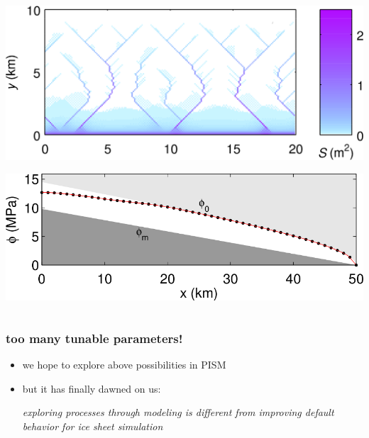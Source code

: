\documentclass[hide notes,intlimits]{beamer}
\begin{document}
\begin{frame}
\begin{columns}
\begin{column}{0.4\textwidth}
\begin{center}
\vspace{4mm}

\includegraphics[width=1.0\textwidth]{schoof-channels}

\vspace{5mm}

\includegraphics[width=1.0\textwidth]{schoof-overburden}
\end{center}
\end{column}
\end{columns}

\end{frame}


\begin{frame}
  \frametitle{too many tunable parameters!}

  \begin{itemize}
  \item we hope to explore above possibilities in PISM
  \item but it has finally dawned on us:
  
  \begin{center}
  \emph{exploring processes through modeling is different from improving default behavior for ice sheet simulation}
  \end{center}
  \end{itemize}
\end{frame}
\end{document}
